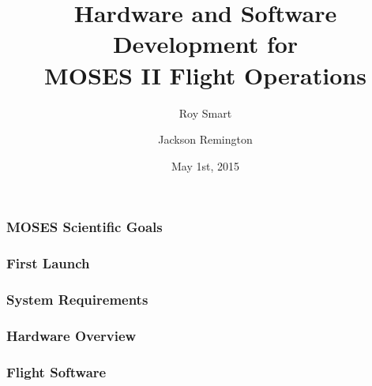 \documentclass[landscape,xcolor={table}]{beamer}
\title[...]{Hardware and Software Development for \\ MOSES II Flight Operations}
\author[Smart, Mashburn]{Roy Smart \and Jackson Remington}
\institute{Montana State University}
\date{May 1st, 2015}
\begin{document}
	\begin{frame}[plain]
	        \titlepage
	\end{frame}
	
	\begin{frame}
		
		\frametitle{MOSES Scientific Goals}

	\end{frame}
	
	\begin{frame}
		
		\frametitle{First Launch}

	\end{frame}

	\begin{frame}
		
		\frametitle{System Requirements}

	\end{frame}
	
	\begin{frame}
		
		\frametitle{Hardware Overview}

	\end{frame}
	
	\begin{frame}
		
		\frametitle{Flight Software}

	\end{frame}
	
\end{document}
